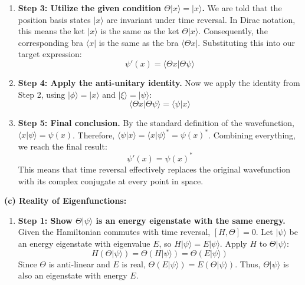 \begin{solution}
\begin{enumerate}
    \item \textbf{Step 3: Utilize the given condition $\Theta |x\rangle = |x\rangle$.}
    We are told that the position basis states $|x\rangle$ are invariant under time reversal. In Dirac notation, this means the ket $|x\rangle$ is the same as the ket $\Theta |x\rangle$. Consequently, the corresponding bra $\langle x |$ is the same as the bra $\langle \Theta x |$.
    Substituting this into our target expression:
    \[ \psi'(x) = \langle \Theta x | \Theta \psi \rangle \]

    \item \textbf{Step 4: Apply the anti-unitary identity.}
    Now we apply the identity from Step 2, using $|\phi\rangle = |x\rangle$ and $|\xi\rangle = |\psi\rangle$:
    \[ \langle \Theta x | \Theta \psi \rangle = \langle \psi | x \rangle \]

    \item \textbf{Step 5: Final conclusion.}
    By the standard definition of the wavefunction, $\langle x | \psi \rangle = \psi(x)$. Therefore, $\langle \psi | x \rangle = \langle x | \psi \rangle^* = \psi(x)^*$.
    Combining everything, we reach the final result:
    \[ \psi'(x) = \psi(x)^* \]
    This means that time reversal effectively replaces the original wavefunction with its complex conjugate at every point in space.
\end{enumerate}
\textbf{(c) Reality of Eigenfunctions:}
\begin{enumerate}
    \item \textbf{Step 1: Show $\Theta|\psi\rangle$ is an energy eigenstate with the same energy.}
    Given the Hamiltonian commutes with time reversal, $[H, \Theta] = 0$. Let $|\psi\rangle$ be an energy eigenstate with eigenvalue $E$, so $H|\psi\rangle = E|\psi\rangle$.
    Apply $H$ to $\Theta|\psi\rangle$:
    \[ H(\Theta|\psi\rangle) = \Theta(H|\psi\rangle) = \Theta(E|\psi\rangle) \]
    Since $\Theta$ is anti-linear and $E$ is real, $\Theta(E|\psi\rangle) = E(\Theta|\psi\rangle)$.
    Thus, $\Theta|\psi\rangle$ is also an eigenstate with energy $E$.
    

\end{enumerate}
\end{solution}
